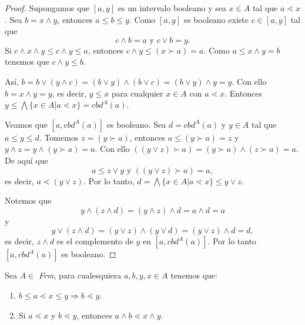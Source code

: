 \begin{proof}
Supongamos que $[a,y]$ es un intervalo booleano y sea $x\in A$ tal que $a\lessdot x$. Sea $b=x\wedge y$, entonces $a\leq b\leq y$. Como $[a,y]$ es booleano existe $c\in [a, y]$ tal que $$c\wedge b=a\mbox{  y  }c\vee b=y.$$
Si $c\wedge x\wedge y\leq c\wedge y\leq a$, entonces $c\wedge y\leq (x\succ a)=a$. Como $a\leq x\wedge y=b$ tenemos que $c\wedge y\leq b$.

\noindent
Así, $b=b\vee (y\wedge c)=(b\vee y)\wedge(b\vee c)=(b\vee y)\wedge y=y$. Con ello $b=x\wedge y=y$, es decir, $y\leq x$ para cualquier $x\in A$ con $a\lessdot x$. Entonces $y\leq \bigwedge\{x\in A|a\lessdot x\}=cbd^A(a)$.

\noindent
Veamos que $[a, cbd^A(a)]$ es booleano. Sea $d=cbd^A(a)$ y $y\in A$ tal que $a\leq y \leq d$. Tomemos $z=(y\succ a)$, entonces $a\leq (y\succ a)=z$ y $y\wedge z=y\wedge (y\succ a)=a$. Con ello $((y\vee z)\succ a)=(y\succ a)\wedge(z\succ a)=a$. De aquí que $$a\leq z\vee y\mbox{ y }((y\vee z)\succ a)=a,$$ 
es decir, $a\lessdot (y\vee z)$. Por lo tanto, $d=\bigwedge\{x\in A|a\lessdot x\}\leq y\vee z$.

\noindent
Notemos que $$y\wedge(z\wedge d)=(y\wedge z)\wedge d=a\wedge d=a$$ y $$y\vee (z\wedge d)=(y\vee z)\wedge (y\vee d)=(y\vee z)\wedge d=d,$$ 
es decir, $z\wedge d$ es el complemento de $y$ en $[a,cbd^A(a)]$. Por lo tanto $[a,cbd^A(a)]$ es booleano. 
\end{proof}

\begin{lemma}
Sea $A\in$ \textit{Frm}, para cualesquiera $a,b,y,x\in A$ tenemos que:
\begin{enumerate}
\item $b\leq a\lessdot x\leq y\Rightarrow b\lessdot y$.
\item Si $a\lessdot x$ y $b\lessdot y$, entonces $a\wedge b\lessdot x\wedge y$.
\end{enumerate}
\end{lemma}

